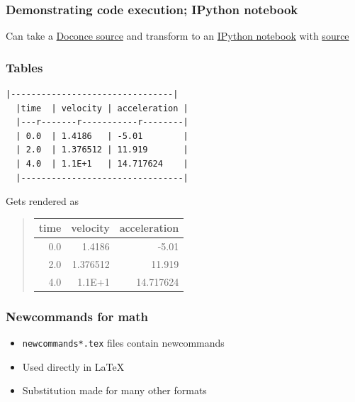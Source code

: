 \documentclass{beamer}
\begin{document}
\begin{frame}
\frametitle{Demonstrating code execution; IPython notebook}

\label{slide:ipynb}

Can take a \href{{http://hplgit.github.com/teamods/writing_reports/_static/report.do.txt.html}}{Doconce source} and transform to an \href{{http://nbviewer.ipython.org/url/hplgit.github.com/teamods/writing_reports/_static/report.ipynb}}{IPython notebook} with \href{{http://hplgit.github.com/teamods/writing_reports/_static/report.ipynb.html}}{source}
\end{frame}

\begin{frame}
\frametitle{Tables}

\begin{Verbatim}[numbers=none,fontsize=\fontsize{9pt}{9pt},baselinestretch=0.95]
  |--------------------------------|
  |time  | velocity | acceleration |
  |---r-------r-----------r--------|
  | 0.0  | 1.4186   | -5.01        |
  | 2.0  | 1.376512 | 11.919       |
  | 4.0  | 1.1E+1   | 14.717624    |
  |--------------------------------|
\end{Verbatim}
Gets rendered as


\begin{quote}\begin{tabular}{rrr}
\hline
\multicolumn{1}{c}{ time } & \multicolumn{1}{c}{ velocity } & \multicolumn{1}{c}{ acceleration } \\
\hline
0.0          & 1.4186       & -5.01        \\
2.0          & 1.376512     & 11.919       \\
4.0          & 1.1E+1       & 14.717624    \\
\hline
\end{tabular}\end{quote}

\noindent
\end{frame}

\begin{frame}
\frametitle{Newcommands for math}

\begin{itemize}
 \item \Verb!newcommands*.tex! files contain newcommands

 \item Used directly in {\LaTeX}

 \item Substitution made for many other formats
\end{itemize}

\noindent
\end{frame}
\end{document}
